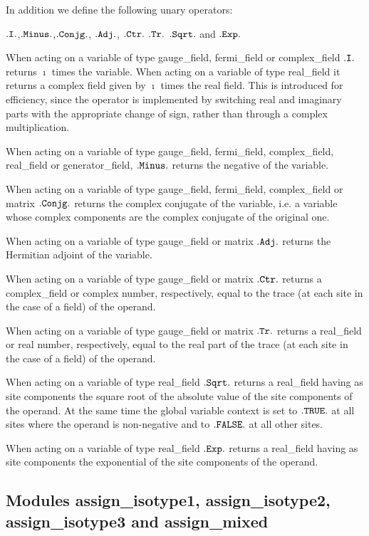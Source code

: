 In addition we define the following unary operators:

\centerline{$\tt .I.$,\quad $\tt .Minus.$,\quad $\tt .Conjg.$,
\quad $\tt .Adj.$, \quad $\tt .Ctr.$  \quad $\tt .Tr.$ \quad
$\tt .Sqrt.$ \quad and \quad $\tt .Exp.$}

When acting on a variable of type gauge\_field, fermi\_field or 
complex\_field $\tt .I.$ returns $\imath$ times the variable.  When
acting on a variable of type real\_field it returns a complex
field given by $\imath$ times the real field.  This is introduced
for efficiency, since the operator is implemented by switching
real and imaginary parts with the appropriate change of sign, rather than
through a complex multiplication.
 
When acting on a variable of type gauge\_field, fermi\_field, 
complex\_field, real\_field or generator\_field,  
$\tt .Minus.$ returns the negative of the variable.
 
When acting on a variable of type gauge\_field, fermi\_field, 
complex\_field or matrix $\tt .Conjg.$ returns the complex conjugate
of the variable, i.e. a variable whose complex components are the
complex conjugate of the original one. 
 
When acting on a variable of type gauge\_field or matrix $\tt .Adj.$ 
returns the Hermitian adjoint of the variable.

When acting on a variable of type gauge\_field or matrix $\tt .Ctr.$ 
returns a complex\_field or complex number, respectively,
equal to the trace (at each site in the case of a field) of
the operand.

When acting on a variable of type gauge\_field or matrix $\tt .Tr.$ 
returns a real\_field or real number, respectively,
equal to the real part of the trace (at each site in the case of a field) 
of the operand.
 
When acting on a variable of type real\_field $\tt .Sqrt.$ 
returns a real\_field having as site components the square root
of the absolute value of the site components of the operand.
At the same time the global variable context is set to $\tt .TRUE.$
at all sites where the operand is non-negative and to $\tt .FALSE.$
at all other sites.
 
When acting on a variable of type real\_field $\tt .Exp.$ 
returns a real\_field having as site components the exponential
of the site components of the operand.

\subsection{Modules assign\_isotype1, assign\_isotype2, \newline 
assign\_isotype3 and assign\_mixed}
\label{assign}

